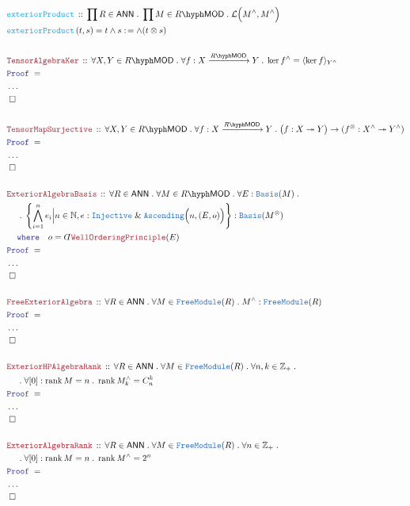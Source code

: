 \documentclass[12pt]{scrartcl}%
\newcommand{\TYPE}[1]{\textcolor{NavyBlue}{\mathtt{#1}}}%
\newcommand{\FUNC}[1]{\textcolor{Cerulean}{\mathtt{#1}}}%
\newcommand{\LOGIC}[1]{\textcolor{Blue}{\mathtt{#1}}}%
\newcommand{\THM}[1]{\textcolor{Maroon}{\mathtt{#1}}}%
\renewcommand{\.}{\; . \;} %
\newcommand{\de}{: \kern 0.1pc =} %
\newcommand{\where}{\LOGIC{where}} %
\newcommand{\Act}[1]{\left( #1 \right)} %
\newcommand{\Theorem}[2]{& \THM{#1} \, :: \, #2 \\ & \Proof = \\ } %
\newcommand{\DeclareFunc}[2]{& \FUNC{#1} \, :: \, #2 \\}%
\newcommand{\DefineNamedFunc}[4]{&  \FUNC{#1}\Act{#2} = #3 \de #4 \\}%
\newcommand{\NewLine}{\\ & \kern 1pc}%
\newcommand{\Page}[1]{ \begin{align*} #1 \end{align*}  }%
\newcommand{ \bd }{ \ByDef }%
\newcommand{\NoProof}{ & \ldots \\ \EndProof}%
\renewcommand{\And}{\; \& \;}%
\newcommand{\Int}{\mathbb{Z}}%
\newcommand{\Nat}{\mathbb{N}}%
\newcommand{\ToSurj}{\twoheadrightarrow} %
\newcommand{\QED}{\; \square} %
\newcommand{\EndProof}{& \QED \\} %
\newcommand{\ByDef}{\rotatebox[origin=c]{-180}{$D$}}%
\newcommand{\Proof}{\LOGIC{Proof} \; } %
\newcommand{\Arrow}[1]{\xrightarrow{#1}}%
\DeclareMathOperator{\rank}{rank} %
\newcommand{\Basis}{\TYPE{Basis}} %
\newcommand{\FM}{\TYPE{FreeModule}}
\newcommand{\LMOD}[1]{#1\hyph\mathsf{MOD}} %
\renewcommand{\L}{\mathcal{L}}
\newcommand{\ANN}{\mathsf{ANN}} %
\begin{document}
\Page{
	\DeclareFunc{exteriorProduct}{\prod R \in \ANN \. \prod M \in \LMOD{R} \. \L\Big( M^\wedge , M^\wedge \Big)} 
	\DefineNamedFunc{exteriorProduct}{t,s}{t \wedge s}{ \wedge(t \otimes s)}
	\\
	\Theorem{TensorAlgebraKer}{ \forall X,Y \in \LMOD{R} \. \forall f : X \Arrow{\LMOD{R}} Y \. \ker f^\wedge = \langle \ker f \rangle_{Y^\wedge}}
	\NoProof
	\\
	\Theorem{TensorMapSurjective}{\forall X,Y \in \LMOD{R} \. \forall f : X \Arrow{\LMOD{R}} Y \. \big(f : X \ToSurj Y \big) \to (f^\otimes : X^\wedge \ToSurj Y^\wedge)}
	\NoProof
	\\
	\Theorem{ExteriorAlgebraBasis}{\forall R \in \ANN \. \forall M \in \LMOD{R} \. \forall E : \Basis(M) \. 
		\NewLine \. \left\{ \bigwedge^n_{i=1} e_i \Big| n \in \Nat, e : \TYPE{Injective} \And \TYPE{Ascending}\Big(n,(E,o) \Big) \right\} : \Basis(M^\otimes)
		\NewLine \where \quad o = \bd \THM{WellOrderingPrinciple}(E)}
	\NoProof
	\\
	\Theorem{FreeExteriorAlgebra}{\forall R \in \ANN \. \forall M \in \FM(R) \. M^\wedge : \FM(R) }
	\NoProof
	\\
	\Theorem{ExteriorHPAlgebraRank}{\forall R \in \ANN \. \forall M \in \FM(R) \. \forall n,k \in \Int_+ \. \NewLine \. \forall [0] : \rank M = n \. \rank  M^\wedge_k = C^k_n }
	\NoProof
	\\
	\Theorem{ExteriorAlgebraRank}{\forall R \in \ANN \. \forall M \in \FM(R) \. \forall n \in \Int_+ \. \NewLine \. \forall [0] : \rank M = n \. \rank  M^\wedge = 2^n }
	\NoProof
}
\end{document}
